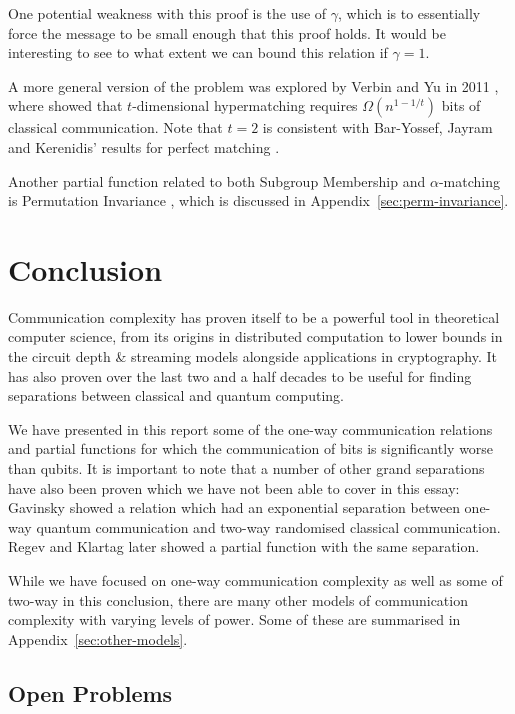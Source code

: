 \documentclass[a4paper]{article}
\begin{document}
        One potential weakness with this proof is the use of $\gamma$, which is to essentially force the message to be small enough that this proof holds. It would be interesting to see to what extent we can bound this relation if $\gamma = 1$.

        A more general version of the problem was explored by Verbin and Yu in 2011 \cite{Verbin:2011:SCC:2133036.2133038}, where showed that $t$-dimensional hypermatching requires $\Omega(n^{1-1/t})$ bits of classical communication. Note that $t=2$ is consistent with Bar-Yossef, Jayram and Kerenidis' results for perfect matching \cite{doi:10.1137/060651835}.

        Another partial function related to both Subgroup Membership and $\alpha$-matching is Permutation Invariance \cite{Montanaro:2011:NES:2230916.2230919}, which is discussed in Appendix~\ref{sec:perm-invariance}.

    \section{Conclusion}
    \label{sec:conclusion}

        Communication complexity has proven itself to be a powerful tool in theoretical computer science, from its origins in distributed computation to lower bounds in the circuit depth \& streaming models alongside applications in cryptography. It has also proven over the last two and a half decades to be useful for finding separations between classical and quantum computing.

        We have presented in this report some of the one-way communication relations and partial functions for which the communication of bits is significantly worse than qubits. It is important to note that a number of other grand separations have also been proven which we have not been able to cover in this essay: Gavinsky \cite{gavinsky2008classical} showed a relation which had an exponential separation between one-way quantum communication and two-way randomised classical communication. Regev and Klartag \cite{Regev:2011:QOC:1993636.1993642} later showed a partial function with the same separation.

        While we have focused on one-way communication complexity as well as some of two-way in this conclusion, there are many other models of communication complexity with varying levels of power. Some of these are summarised in Appendix~\ref{sec:other-models}.

        \subsection{Open Problems}
\end{document}
